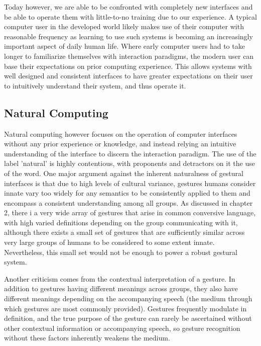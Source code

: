 Today however, we are able to be confronted with completely new interfaces and be able to operate them with little-to-no training due to our experience. A typical computer user in the developed world likely makes use of their computer with reasonable frequency  as learning to use such systems is becoming an increasingly important aspect of daily human life. Where early computer users had to take longer to familiarize themselves with interaction paradigms, the modern user can base their expectations on prior computing experience. This allows systems with well designed and consistent interfaces to have greater expectations on their user to intuitively understand their system, and thus operate it.

\subsection{Natural Computing}

Natural computing however focuses on the operation of computer interfaces without any prior experience or knowledge, and instead relying an intuitive understanding of the interface to discern the interaction paradigm. The use of the label 'natural' is highly contentious, with proponents \cite{OharaEtAl2014} and detractors \cite{Churchill2011} \cite{Norman2010}  on it the use of the word. One major argument against the inherent naturalness of gestural interfaces is that due to high levels of cultural variance, gestures humans consider innate vary too widely for any semantics to be consistently applied to them and encompass a consistent understanding among all groups. As discussed in chapter 2, there i a very wide array of gestures that arise in common conversive language, with high varied definitions depending on the group communicating with it, although there exists a small set of gestures that are sufficiently similar across very large groups of humans to be considered to some extent innate. Nevertheless, this small set would not be enough to power a robust gestural system.

Another criticism comes from the contextual interpretation of a gesture. In addition to gestures having different meanings across groups, they also have different meanings depending on the accompanying speech (the medium through which gestures are most commonly provided). Gestures frequently modulate in definition, and the true purpose of the gesture can rarely be ascertained without other contextual information or accompanying speech, so gesture recognition without these factors inherently weakens the medium.


